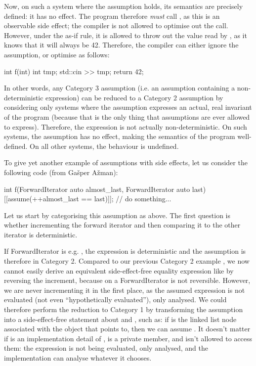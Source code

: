 Now, on such a system where the assumption holds, its semantics are precisely defined: it has no effect. The program therefore \emph{must} call , as this is an observable side effect; the compiler is not allowed to optimise out the call. However, under the as-if rule, it is allowed to throw out the value read by , as it knows that it will always be 42. Therefore, the compiler can either ignore the assumption, or optimise  as follows:
\begin{codeblock}
int f(int) {
  int tmp;
  std::cin >> tmp;
  return 42;
}
\end{codeblock}

In other words, any Category 3 assumption (i.e. an assumption containing a non-deterministic expression) can be reduced to a Category 2 assumption by considering only systems where the assumption expresses an actual, real invariant of the program (because that is the only thing that assumptions are ever allowed to express). Therefore, the expression is not actually non-deterministic. On such systems, the assumption has no effect, making the semantics of the program well-defined. On all other systems, the behaviour is undefined.

To give yet another example of assumptions with side effects, let us consider the following code (from Ga\v sper A\v zman):

\begin{codeblock}
int f(ForwardIterator auto almost_last, ForwardIterator auto last) {
  [[assume(++almost_last == last)]];
  // do something...
}
\end{codeblock}

Let us start by categorising this assumption as above. The first question is whether incrementing the forward iterator and then comparing it to the other iterator is deterministic.

If ForwardIterator is e.g. , the expression is deterministic and the assumption is therefore in Category 2. Compared to our previous Category 2 example \tcode{[[assume(++i  == 43)]]}, we now cannot easily derive an equivalent side-effect-free equality expression like \tcode{[[assume(i == 42)]]} by reversing the increment, because  on a ForwardIterator is not reversible. However, we are never incrementing it in the first place, as the assumed expression is not evaluated (not even ``hypothetically evaluated''), only analysed. We could therefore perform the reduction to Category 1 by transforming the assumption into a side-effect-free statement about  and , such as: if  is the linked list node associated with the object that  points to, then we can assume . It doesn’t matter if  is an implementation detail of ,  is a private member, and  isn’t allowed to access them: the expression is not being evaluated, only analysed, and the implementation can analyse whatever it chooses.

